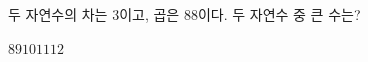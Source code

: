 두 자연수의 차는 $3$이고, 곱은 $88$이다. 두 자연수 중 큰 수는?
\begin{choices32}{$8$}{$9$}{$10$}{$11$}{$12$}\end{choices32}
